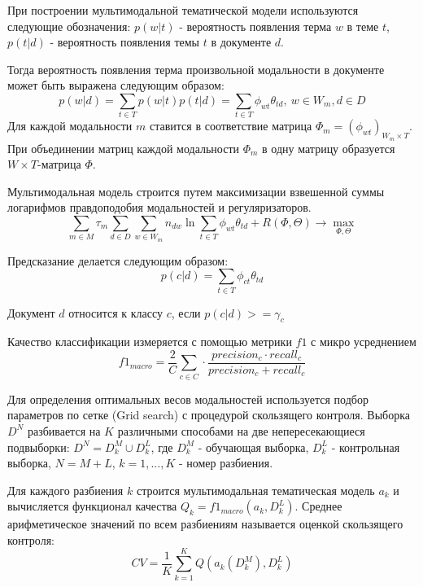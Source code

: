 \documentclass[12pt, twoside]{article}
\begin{document}
При построении мультимодальной тематической модели используются следующие обозначения: $p(w|t)$ - вероятность появления терма $w$ в теме $t$, $p(t|d)$ - вероятность появления темы $t$ в документе $d$. 

Тогда вероятность появления терма произвольной модальности в документе может быть выражена следующим образом:
\begin{equation}
	p(w|d) = \sum\limits_{t \in T}p(w|t)p(t|d) = \sum\limits_{t \in T}\phi_{wt}\theta_{td}, \ w \in W_m, d \in D
\end{equation}
Для каждой модальности $m$ ставится в соответствие матрица $\Phi_m = (\phi_{wt})_{W_m \times T}$. При объединении матриц каждой модальности $\Phi_m$ в одну матрицу образуется $W \times T$-матрица $\Phi$.

Мультимодальная модель строится путем максимизации взвешенной суммы логарифмов правдоподобия модальностей и регуляризаторов.
\begin{equation}
    \sum\limits_{m \in M} \tau_m \sum\limits_{d \in D} \sum\limits_{w \in W_m} n_{dw} \ln \sum\limits_{t \in T} \phi_{wt}\theta_{td} + R(\Phi, \Theta) \rightarrow  \max_{\Phi, \Theta} %
\end{equation}

Предсказание делается следующим образом:
\begin{equation}
    p(c|d) = \sum_{t \in T} \phi_{ct}\theta_{td} %
\end{equation}

Документ $d$ относится к классу $c$, если $p(c|d) >= \gamma_c$


Качество классификации измеряется с помощью метрики $f1$ с микро усреднением
\begin{equation}
    f1_{macro} = \frac{2}{C} \sum\limits_{c \in C} \cdot \frac{precision_c \cdot recall_c}{precision_c + recall_c}
\end{equation}


Для определения оптимальных весов модальностей используется подбор параметров по сетке (Grid search) с процедурой скользящего контроля. Выборка $D^N$ разбивается на $K$ различными способами на две непересекающиеся подвыборки: $D^N = D_k^{M} \cup D_k^{L}$, где $D_k^{M}$ - обучающая выборка, $D_k^{L}$ - контрольная выборка, $N = M + L$, $k = 1,...,K$ - номер разбиения.

Для каждого разбиения $k$ строится мультимодальная тематическая модель $a_k$ и вычисляется функционал качества $Q_k = f1_{macro}(a_k, D_k^{L})$. Среднее арифметическое значений по всем разбиениям называется оценкой скользящего контроля:
\begin{equation}
    CV = \frac{1}{K} \sum_{k = 1}^K Q(a_k(D_k^{M}), D_k^{L})
\end{equation}
    
\end{document}
